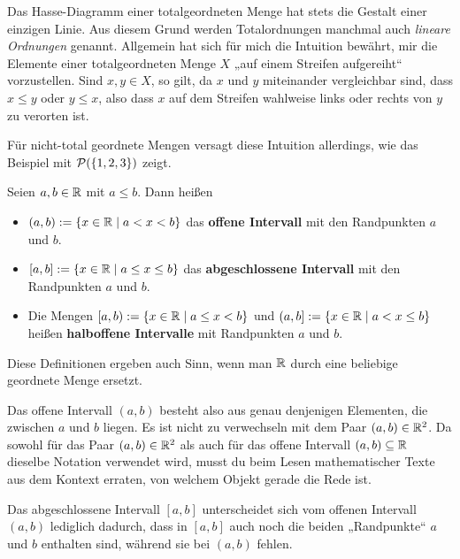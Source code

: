 \begin{bem}
    Das Hasse-Diagramm einer totalgeordneten Menge hat stets die Gestalt einer einzigen Linie. Aus diesem Grund werden Totalordnungen manchmal auch \emph{lineare Ordnungen} genannt. Allgemein hat sich für mich die Intuition bewährt, mir die Elemente einer totalgeordneten Menge $X$ „auf einem Streifen aufgereiht“ vorzustellen. Sind $x,y\in X$, so gilt, da $x$ und $y$ miteinander vergleichbar sind, dass $x\le y$ oder $y\le x$, also dass $x$ auf dem Streifen wahlweise links oder rechts von $y$ zu verorten ist.

    Für nicht-total geordnete Mengen versagt diese Intuition allerdings, wie das Beispiel mit $\mathcal P(\{1,2,3\})$ zeigt.
\end{bem}


\begin{de}[Intervalle in $\R$] \label{def:intervall} 
    Seien $a,b\in \mathbb R$ mit $a\le b$. Dann heißen
    \begin{itemize}
        \item $(a,b) := \{ x\in \mathbb R \mid a<x<b \}$ das \textbf{offene Intervall} mit den Randpunkten $a$ und $b$. 
        \item $[a,b] := \{ x\in \mathbb R \mid a\le x\le b \}$ das \textbf{abgeschlossene Intervall} mit den Randpunkten $a$ und $b$.
        \item Die Mengen $[a,b) := \{ x\in \mathbb R \mid a\le x<b \}$ und $(a,b] := \{ x\in \mathbb R \mid a<x\le b \}$ heißen \textbf{halboffene Intervalle} mit Randpunkten $a$ und $b$. 
    \end{itemize}
    Diese Definitionen ergeben auch Sinn, wenn man $\R$ durch eine beliebige geordnete Menge ersetzt.
\end{de}


\begin{bem}
    Das offene Intervall $(a,b)$ besteht also aus genau denjenigen Elementen, die zwischen $a$ und $b$ liegen. Es ist nicht zu verwechseln mit dem Paar $(a,b)\in \mathbb R^2$. Da sowohl für das Paar $(a,b)\in \mathbb R^2$ als auch für das offene Intervall $(a,b)\subseteq \mathbb R$ dieselbe Notation verwendet wird, musst du beim Lesen mathematischer Texte aus dem Kontext erraten, von welchem Objekt gerade die Rede ist.
    
    Das abgeschlossene Intervall $[a,b]$ unterscheidet sich vom offenen Intervall $(a,b)$ lediglich dadurch, dass in $[a,b]$ auch noch die beiden „Randpunkte“ $a$ und $b$ enthalten sind, während sie bei $(a,b)$ fehlen.
\end{bem}



